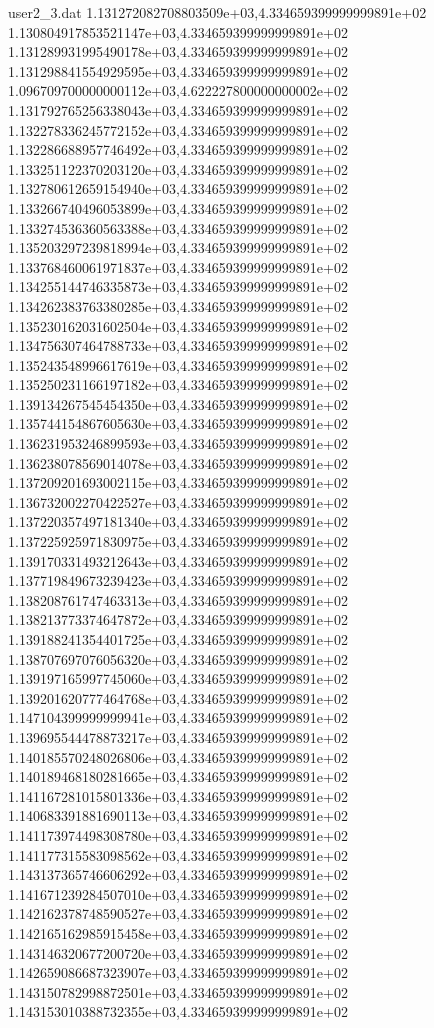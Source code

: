 \begin{filecontents}{user2_3.dat}
1.131272082708803509e+03,4.334659399999999891e+02
1.130804917853521147e+03,4.334659399999999891e+02
1.131289931995490178e+03,4.334659399999999891e+02
1.131298841554929595e+03,4.334659399999999891e+02
1.096709700000000112e+03,4.622227800000000002e+02
1.131792765256338043e+03,4.334659399999999891e+02
1.132278336245772152e+03,4.334659399999999891e+02
1.132286688957746492e+03,4.334659399999999891e+02
1.133251122370203120e+03,4.334659399999999891e+02
1.132780612659154940e+03,4.334659399999999891e+02
1.133266740496053899e+03,4.334659399999999891e+02
1.133274536360563388e+03,4.334659399999999891e+02
1.135203297239818994e+03,4.334659399999999891e+02
1.133768460061971837e+03,4.334659399999999891e+02
1.134255144746335873e+03,4.334659399999999891e+02
1.134262383763380285e+03,4.334659399999999891e+02
1.135230162031602504e+03,4.334659399999999891e+02
1.134756307464788733e+03,4.334659399999999891e+02
1.135243548996617619e+03,4.334659399999999891e+02
1.135250231166197182e+03,4.334659399999999891e+02
1.139134267545454350e+03,4.334659399999999891e+02
1.135744154867605630e+03,4.334659399999999891e+02
1.136231953246899593e+03,4.334659399999999891e+02
1.136238078569014078e+03,4.334659399999999891e+02
1.137209201693002115e+03,4.334659399999999891e+02
1.136732002270422527e+03,4.334659399999999891e+02
1.137220357497181340e+03,4.334659399999999891e+02
1.137225925971830975e+03,4.334659399999999891e+02
1.139170331493212643e+03,4.334659399999999891e+02
1.137719849673239423e+03,4.334659399999999891e+02
1.138208761747463313e+03,4.334659399999999891e+02
1.138213773374647872e+03,4.334659399999999891e+02
1.139188241354401725e+03,4.334659399999999891e+02
1.138707697076056320e+03,4.334659399999999891e+02
1.139197165997745060e+03,4.334659399999999891e+02
1.139201620777464768e+03,4.334659399999999891e+02
1.147104399999999941e+03,4.334659399999999891e+02
1.139695544478873217e+03,4.334659399999999891e+02
1.140185570248026806e+03,4.334659399999999891e+02
1.140189468180281665e+03,4.334659399999999891e+02
1.141167281015801336e+03,4.334659399999999891e+02
1.140683391881690113e+03,4.334659399999999891e+02
1.141173974498308780e+03,4.334659399999999891e+02
1.141177315583098562e+03,4.334659399999999891e+02
1.143137365746606292e+03,4.334659399999999891e+02
1.141671239284507010e+03,4.334659399999999891e+02
1.142162378748590527e+03,4.334659399999999891e+02
1.142165162985915458e+03,4.334659399999999891e+02
1.143146320677200720e+03,4.334659399999999891e+02
1.142659086687323907e+03,4.334659399999999891e+02
1.143150782998872501e+03,4.334659399999999891e+02
1.143153010388732355e+03,4.334659399999999891e+02

\end{filecontents}
